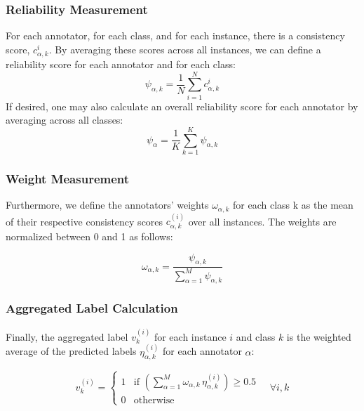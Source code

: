 \subsubsection{Reliability Measurement}
For each annotator, for each class, and for each instance, there is a consistency score, $c_{\alpha,k}^i$. By averaging these scores across all instances, we can define a reliability score for each annotator and for each class:
\begin{equation}
\psi_{\alpha,k}=\frac{1}{N}\sum_{i=1}^N c_{\alpha,k}^i
\end{equation}
If desired, one may also calculate an overall reliability score for each annotator by averaging across all classes:
\begin{equation}
\psi_{\alpha}=\frac{1}{K}\sum_{k=1}^K \psi_{\alpha,k}
\end{equation}


\subsubsection{Weight Measurement}

Furthermore, we define the annotators' weights $\omega_{\alpha,k}$ for each class k as the mean of their respective consistency scores $c_{\alpha,k}^{(i)} $ over all instances. The weights are normalized between 0 and 1 as follows:


\begin{equation}
    \omega_{\alpha,k}=\frac{\psi_{\alpha,k}}{\sum_{\alpha=1}^ M\psi_{\alpha,k}}
    \label{eq:crowd.eq.11.weights}
\end{equation}


\subsubsection{Aggregated Label Calculation}

Finally, the aggregated label $v_k^{(i)} $ for each instance $i $ and class $k $ is the weighted average of the predicted labels $\eta_{\alpha,k}^{(i)} $ for each annotator $\alpha $:

\begin{equation}
    v_k^{(i)} =
    \begin{cases}
        1 & \text{if } \left(\sum_{\alpha=1}^{M} \omega_{\alpha,k}\, \eta_{\alpha,k}^{(i)}\right) \geq 0.5 \\
        0 & \text{otherwise}
    \end{cases}
    \quad \forall i, k
    \label{eq:crowd.eq.12.aggregated-label}
\end{equation}

